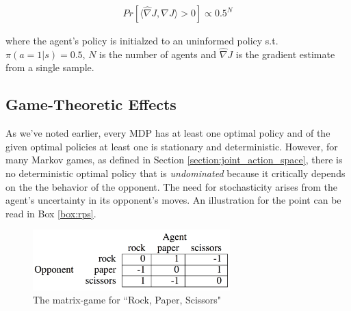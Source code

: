 \documentclass[12pt,a4paper]{article}
\begin{document}
\begin{align}
Pr\left[ \langle \hat{\nabla} J, \nabla J \rangle > 0 \right] \propto 0.5^N
\end{align}

where the agent's policy is initialzed to an uninformed policy s.t. $\pi(a = 1|s) = 0.5$, $N$ is
the number of agents and $\hat{\nabla} J$ is the gradient estimate from a single sample.

\subsection{Game-Theoretic Effects} \label{section:game_theoretic_effects}

As we've noted earlier, every MDP has at least one optimal policy and of the given optimal
policies at least one is stationary and deterministic. However, for many Markov games, as 
defined in Section \ref{section:joint_action_space}, there is no deterministic optimal policy that 
is \textit{undominated} because it critically depends on the the behavior of the opponent. The
need for stochasticity arises from the agent's uncertainty in its opponent's moves. An 
illustration for the point can be read in Box \ref{box:rps}.

\begin{figure}[ht]
\centering
\includegraphics[width=3in]{rps}
\caption{The matrix-game for ``Rock, Paper, Scissors" \cite{Littman:1994:MGF:3091574.3091594}} \label{fig:rock_paper_scissors}
\end{figure}
\end{document}
